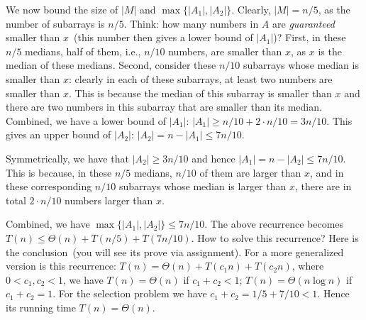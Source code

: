 We now bound the size of $|M|$ and $\max\{|A_1|, |A_2|\}$.
Clearly, $|M| = n/5$, as the number of subarrays is $n/5$.
Think: how many numbers in $A$ are \emph{guaranteed} smaller than $x$~(this number then gives a lower bound of $|A_1|$)?
First, in these $n/5$ medians, half of them, i.e., $n/10$ numbers, are smaller than $x$, as $x$ is the median of these medians.
Second, consider these $n/10$ subarrays whose median is smaller than $x$: clearly in each of these subarrays, at least
two numbers are smaller than $x$. This is because the median of this subarray is smaller than $x$ and there are two numbers
in this subarray that are smaller than its median. Combined, we have a lower bound of $|A_1|$: $|A_1| \ge n/10 + 2 \cdot n/10 = 3n/10$.
This gives an upper bound of $|A_2|$: $|A_2| = n - |A_1| \le 7n/10$.

Symmetrically, we have that $|A_2| \ge 3n/10$ and hence $|A_1| = n - |A_2| \le 7n/10$.
This is because, in these $n/5$ medians, $n/10$ of them are larger than $x$,
and in these corresponding $n/10$ subarrays whose median is larger than $x$, there are in total $2\cdot n/10$ numbers larger than $x$.

Combined, we have $\max\{|A_1|, |A_2|\} \le 7n/10$.  The above recurrence becomes $T(n) \le \Theta(n) + T(n/5) + T(7n/10)$.
How to solve this recurrence? Here is the conclusion~(you will see its prove via assignment).
For a more generalized version is this recurrence: $T(n) = \Theta(n) + T(c_1n) + T(c_2n)$, where $0 < c_1, c_2 < 1$, 
we have $T(n) = \Theta(n)$ if $c_1 + c_2 < 1$;
$T(n) = \Theta(n\log n)$ if $c_1 + c_2 = 1$.
For the selection problem we have $c_1 + c_2 = 1/5 + 7/10 < 1$. Hence
its running time $T(n) = \Theta(n)$.


